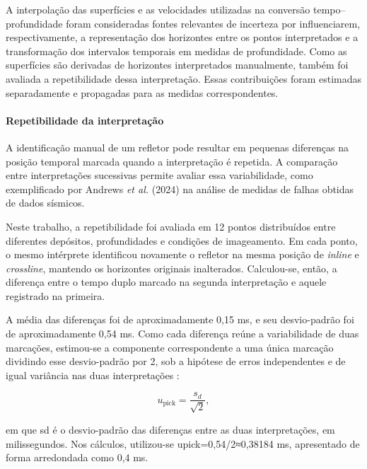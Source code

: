 A interpolação das superfícies e as velocidades utilizadas na conversão tempo--profundidade foram consideradas fontes relevantes de incerteza por influenciarem, respectivamente, a representação dos horizontes entre os pontos interpretados e a transformação dos intervalos temporais em medidas de profundidade. Como as superfícies são derivadas de horizontes interpretados manualmente, também foi avaliada a repetibilidade dessa interpretação. Essas contribuições foram estimadas separadamente e propagadas para as medidas correspondentes.

\paragraph{Repetibilidade da interpretação}

A identificação manual de um refletor pode resultar em pequenas diferenças na posição temporal marcada quando a interpretação é repetida. A comparação entre interpretações sucessivas permite avaliar essa variabilidade, como exemplificado por Andrews \textit{et al.} (2024) na análise de medidas de falhas obtidas de dados sísmicos.

Neste trabalho, a repetibilidade foi avaliada em 12 pontos distribuídos entre diferentes depósitos, profundidades e condições de imageamento. Em cada ponto, o mesmo intérprete identificou novamente o refletor na mesma posição de \textit{inline} e \textit{crossline}, mantendo os horizontes originais inalterados. Calculou-se, então, a diferença entre o tempo duplo marcado na segunda interpretação e aquele registrado na primeira.

A média das diferenças foi de aproximadamente 0,15 ms, e seu desvio-padrão foi de aproximadamente 0,54 ms. Como cada diferença reúne a variabilidade de duas marcações, estimou-se a componente correspondente a uma única marcação dividindo esse desvio-padrão por 2, sob a hipótese de erros independentes e de igual variância nas duas interpretações \cite{taylor1997}:

\begin{equation}
  u_{\mathrm{pick}}=\frac{s_d}{\sqrt{2}},
  \label{eq:repetibilidade}
\end{equation}

\noindent
em que sd é o desvio-padrão das diferenças entre as duas interpretações, em milissegundos. Nos cálculos, utilizou-se upick=0,54/2≈0,38184 ms, apresentado de forma arredondada como 0,4 ms.


